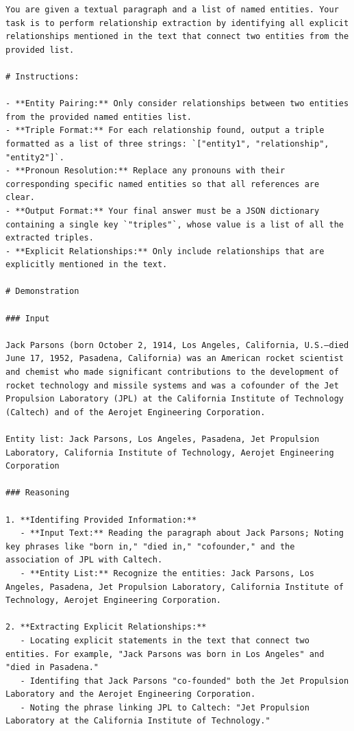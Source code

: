 \documentclass{article}
\begin{document}
\begin{lstlisting}[style=promptstyle, caption={RE prompt},label={lst:re}]
You are given a textual paragraph and a list of named entities. Your task is to perform relationship extraction by identifying all explicit relationships mentioned in the text that connect two entities from the provided list.

# Instructions:

- **Entity Pairing:** Only consider relationships between two entities from the provided named entities list.
- **Triple Format:** For each relationship found, output a triple formatted as a list of three strings: `["entity1", "relationship", "entity2"]`.
- **Pronoun Resolution:** Replace any pronouns with their corresponding specific named entities so that all references are clear.
- **Output Format:** Your final answer must be a JSON dictionary containing a single key `"triples"`, whose value is a list of all the extracted triples.
- **Explicit Relationships:** Only include relationships that are explicitly mentioned in the text.

# Demonstration

### Input
 
Jack Parsons (born October 2, 1914, Los Angeles, California, U.S.—died June 17, 1952, Pasadena, California) was an American rocket scientist and chemist who made significant contributions to the development of rocket technology and missile systems and was a cofounder of the Jet Propulsion Laboratory (JPL) at the California Institute of Technology (Caltech) and of the Aerojet Engineering Corporation.

Entity list: Jack Parsons, Los Angeles, Pasadena, Jet Propulsion Laboratory, California Institute of Technology, Aerojet Engineering Corporation

### Reasoning

1. **Identifing Provided Information:**  
   - **Input Text:** Reading the paragraph about Jack Parsons; Noting key phrases like "born in," "died in," "cofounder," and the association of JPL with Caltech.  
   - **Entity List:** Recognize the entities: Jack Parsons, Los Angeles, Pasadena, Jet Propulsion Laboratory, California Institute of Technology, Aerojet Engineering Corporation.

2. **Extracting Explicit Relationships:**  
   - Locating explicit statements in the text that connect two entities. For example, "Jack Parsons was born in Los Angeles" and "died in Pasadena."
   - Identifing that Jack Parsons "co-founded" both the Jet Propulsion Laboratory and the Aerojet Engineering Corporation.
   - Noting the phrase linking JPL to Caltech: "Jet Propulsion Laboratory at the California Institute of Technology."


\end{lstlisting}
\end{document}
